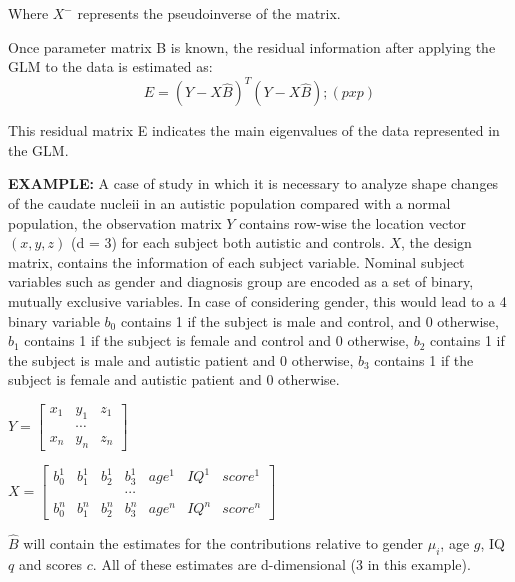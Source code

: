 \documentclass{InsightArticle}
\begin{document}
Where $X^-$ represents the pseudoinverse of the matrix.

Once parameter matrix B is known, the residual information after applying the GLM to the data is estimated as:
\begin{equation}
 E = (Y - X \hat{B})^T (Y - X \hat{B} ); (pxp)
\end{equation}  

This residual matrix E indicates the main eigenvalues of the data represented in the GLM.

\textbf{ EXAMPLE:} A case of study in which it is necessary to analyze shape changes of the caudate nucleii in an autistic population compared with a normal population, the observation matrix $Y$ contains row-wise the location vector $(x,y,z)$ (d = 3) for each subject both autistic and controls. $X$, the design matrix, contains the information of each subject variable. Nominal subject variables such as gender and diagnosis group are encoded as a set of binary, mutually exclusive variables. In case of considering gender, this would lead to a 4 binary variable $b_0$ contains 1 if the subject is male and control, and 0 otherwise, $b_1$ contains 1 if the subject is female and control and 0 otherwise, $b_2$ contains 1 if the subject is male and autistic patient and 0 otherwise, $b_3$ contains 1 if the subject is female and autistic patient and 0 otherwise.

\begin{center}
$Y = \left[ \begin{array}{cccc} x_1 & y_1 & z_1 \\ & \cdots & \\ x_n & y_n & z_n  \end{array} \right]$
\end{center}
\vspace{.1 in}


\begin{center}
$X = \left[ \begin{array}{ccccccc} b^1_0 & b^1_1 & b^1_2 & b^1_3 & age^1 & IQ^1 & score^1 \\ & & & \cdots & & & \\ b^n_0 & b^n_1 & b^n_2 & b^n_3 & age^n & IQ^n & score^n  \end{array} \right]$
\end{center}
\vspace{.1 in}

$\hat{B}$ will contain the estimates for the contributions relative to gender $\mu_i$, age $g$, IQ $q$ and scores $c$. All of these estimates are d-dimensional (3 in this example).
\vspace{.1 in}
\end{document}
